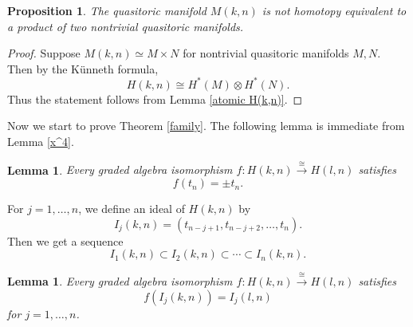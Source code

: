 \documentclass[a4paper]{amsart}
\numberwithin{equation}{section}
\newtheorem{proposition}[theorem]{Proposition}
\newtheorem{lemma}[theorem]{Lemma}
\theoremstyle{definition}
\theoremstyle{remark}
\numberwithin{equation}{section}
\newcommand{\Z}{\mathbb{Z}}
\begin{document}
\begin{proposition}
  \label{atomicity}
  The quasitoric manifold $M(k,n)$ is not homotopy equivalent to a product of two nontrivial quasitoric manifolds.
\end{proposition}

\begin{proof}
  Suppose $M(k,n)\simeq M\times N$ for nontrivial quasitoric manifolds $M,N$. Then by the K\"{u}nneth formula,
  \[
    H(k,n)\cong H^*(M)\otimes H^*(N).
  \]
  Thus the statement follows from Lemma \ref{atomic H(k,n)}.
\end{proof}



Now we start to prove Theorem \ref{family}. The following lemma is immediate from Lemma \ref{x^4}.



\begin{lemma}
  \label{f(t_n)}
  Every graded algebra isomorphism $f\colon H(k,n)\xrightarrow{\cong}H(l,n)$ satisfies
  \[
    f(t_n)=\pm t_n.
  \]
\end{lemma}




For $j=1,\ldots,n$, we define an ideal of $H(k,n)$ by
\[
  I_j(k,n)=(t_{n-j+1},t_{n-j+2},\ldots,t_n).
\]
Then we get a sequence
\[
  I_1(k,n)\subset I_2(k,n)\subset\cdots\subset I_n(k,n).
\]



\begin{lemma}
  \label{I(k,n)}
  Every graded algebra isomorphism $f\colon H(k,n)\xrightarrow{\cong}H(l,n)$ satisfies
  \[
    f(I_j(k,n))=I_j(l,n)
  \]
  for $j=1,\ldots,n$.
\end{lemma}
\end{document}
